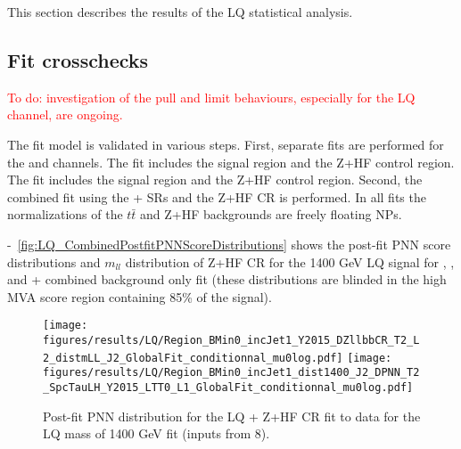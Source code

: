 This section describes the results of the LQ statistical analysis.

\subsection{Fit crosschecks}
\label{subsec:LQ_fitcrosschecks}

\textcolor{red}{To do: investigation of the pull and limit behaviours, especially for the LQ \lephad channel, are ongoing.}

The fit model is validated in various steps.  First, separate fits are performed for the \hadhad and \lephad channels. 
The \hadhad fit includes the \hadhad signal region and the Z+HF control region. The \lephad fit includes the \lephad signal 
region and the Z+HF control region. Second, the combined fit using the \lephad + \hadhad SRs and the Z+HF CR is 
performed. In all fits the normalizations of the $t\bar{t}$ and Z+HF backgrounds are freely floating NPs. 


 -~\ref{fig:LQ_CombinedPostfitPNNScoreDistributions} shows the post-fit PNN score 
distributions and $m_{ll}$ distribution of Z+HF CR for the 1400 GeV LQ signal for \hadhad, \lephad, and \lephad + \hadhad combined 
background only fit (these distributions are blinded in the high MVA score region containing 85\% of the signal). 

\begin{figure}
\centering
\texttt{[image: figures/results/LQ/Region\_BMin0\_incJet1\_Y2015\_DZllbbCR\_T2\_L2\_distmLL\_J2\_GlobalFit\_conditionnal\_mu0log.pdf]}
\texttt{[image: figures/results/LQ/Region\_BMin0\_incJet1\_dist1400\_J2\_DPNN\_T2\_SpcTauLH\_Y2015\_LTT0\_L1\_GlobalFit\_conditionnal\_mu0log.pdf]}
\caption{Post-fit PNN distribution for the LQ \lephad + Z+HF CR fit to data for the LQ mass of 1400 GeV fit (inputs from 8).}
\label{fig:LQ_LepHadPostfitPNNScoreDistributions}
\end{figure}

